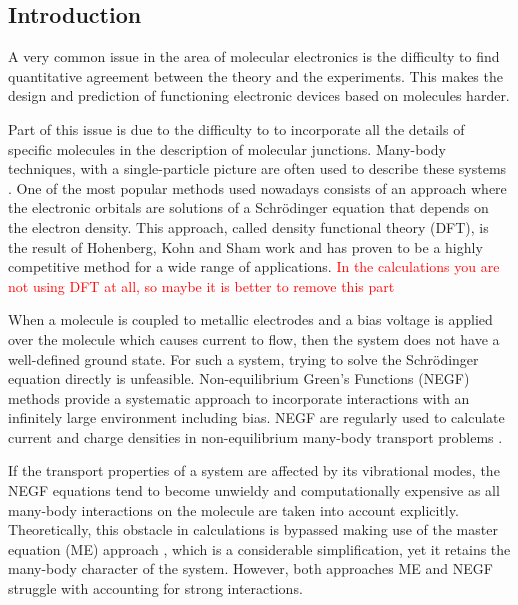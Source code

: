 \documentclass{article}
\begin{document}
\begin{multicols}{2}
        
    \section{Introduction}
        A very common issue in the area of molecular electronics is the difficulty to find quantitative agreement between the theory and the experiments. This makes the design and prediction of functioning electronic devices based on molecules harder.
        
        Part of this issue is due to the difficulty to to incorporate all the details of specific molecules in the description of molecular junctions. Many-body techniques, with a single-particle picture are often used to describe these systems \cite{Tsuneda2014}. One of the most popular methods used nowadays consists of an approach where the electronic orbitals are solutions of a Schr\"odinger equation that depends on the electron density. This approach, called density functional theory (DFT), is the result of Hohenberg, Kohn and Sham work \cite{Hohenberg1964, kohnsham, nobel1998} and has proven to be a highly competitive method for a wide range of applications. \textcolor{red}{In the calculations you are not using DFT at all, so maybe it is better to remove this part}
        
        When a molecule is coupled to metallic electrodes and a bias voltage is applied over the molecule which causes current to flow, then the system does not have a well-defined ground state. For such a system, trying to solve the Schr\"odinger equation directly is unfeasible. Non-equilibrium Green's Functions (NEGF) methods provide a systematic approach to incorporate interactions with an infinitely large environment including bias. NEGF are regularly used to calculate current and charge densities in non-equilibrium many-body transport problems \cite{Mattuck1976, Jauho1994, Haug1997, Datta1997}. 
         
                
        If the transport properties of a system are affected by its vibrational modes, the NEGF equations tend to become unwieldy and computationally expensive as all many-body interactions on the molecule are taken into account explicitly. Theoretically, this obstacle in calculations is bypassed making use of the master equation (ME) approach \cite{beenakker}, which is a considerable simplification, yet it retains the many-body character of the system. However, both approaches ME and NEGF struggle with accounting for strong interactions.
        

\end{multicols}
\end{document}
